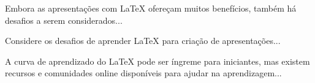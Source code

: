 Embora as apresentações com LaTeX ofereçam muitos benefícios, também há desafios a serem considerados...

\begin{exercise}
    Considere os desafios de aprender LaTeX para criação de apresentações...
\end{exercise}

\begin{solution}
    A curva de aprendizado do LaTeX pode ser íngreme para iniciantes, mas existem recursos e comunidades online disponíveis para ajudar na aprendizagem...
\end{solution}